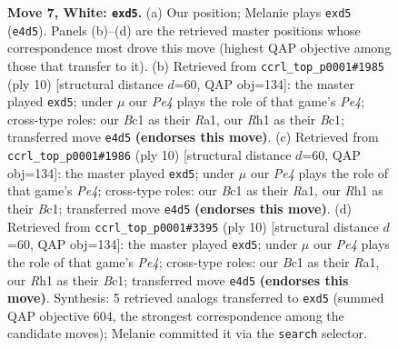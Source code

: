 \documentclass[11pt]{article}
\begin{document}
\begin{figure}[p]
\caption{\textbf{Move 7, White: \texttt{exd5}.} (a) Our position; Melanie plays \texttt{exd5} (\texttt{e4d5}). Panels (b)--(d) are the retrieved master positions whose correspondence most drove this move (highest QAP objective among those that transfer to it). (b) Retrieved from \texttt{ccrl\_top\_p0001\#1985} (ply 10) [structural distance $d$=60, QAP obj=134]: the master played \texttt{exd5}; under $\mu$ our \emph{Pe4} plays the role of that game's \emph{Pe4}; cross-type roles: our \emph{B}c1 as their \emph{R}a1, our \emph{R}h1 as their \emph{B}c1; transferred move \texttt{e4d5} \textbf{(endorses this move)}. (c) Retrieved from \texttt{ccrl\_top\_p0001\#1986} (ply 10) [structural distance $d$=60, QAP obj=134]: the master played \texttt{exd5}; under $\mu$ our \emph{Pe4} plays the role of that game's \emph{Pe4}; cross-type roles: our \emph{B}c1 as their \emph{R}a1, our \emph{R}h1 as their \emph{B}c1; transferred move \texttt{e4d5} \textbf{(endorses this move)}. (d) Retrieved from \texttt{ccrl\_top\_p0001\#3395} (ply 10) [structural distance $d$=60, QAP obj=134]: the master played \texttt{exd5}; under $\mu$ our \emph{Pe4} plays the role of that game's \emph{Pe4}; cross-type roles: our \emph{B}c1 as their \emph{R}a1, our \emph{R}h1 as their \emph{B}c1; transferred move \texttt{e4d5} \textbf{(endorses this move)}. Synthesis: 5 retrieved analogs transferred to \texttt{exd5} (summed QAP objective 604, the strongest correspondence among the candidate moves); Melanie committed it via the \texttt{search} selector.}
\label{fig:thought-m12}
\end{figure}

\clearpage
\end{document}
